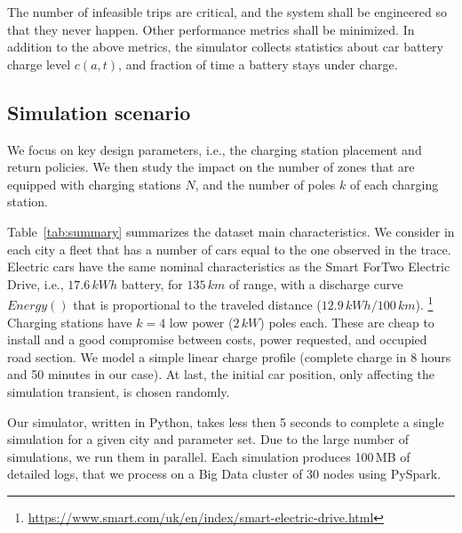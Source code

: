 The number of infeasible trips are critical, and the system shall be engineered so that they never happen. Other performance metrics shall be minimized. 
In addition to the above metrics, the simulator collects statistics about car battery charge level $c(a,t)$, and fraction of time a battery stays under charge.

\subsection{Simulation scenario}

We focus on key design parameters, i.e., the charging station placement and return policies.
We then study the impact on the number of zones that are equipped with charging stations $N$, and the number of poles $k$ of each charging station.

Table~\ref{tab:summary} summarizes the dataset main characteristics.
We consider in each city a fleet that has a number of cars equal to the one observed in the trace. Electric cars have the same nominal characteristics as the Smart ForTwo Electric Drive, i.e., $17.6\,kWh$ battery, for $135\,km$ of range, with a discharge curve $Energy()$ that is proportional to the traveled distance ($12.9\,kWh/100\,km$). \footnote{\url{https://www.smart.com/uk/en/index/smart-electric-drive.html}} 
Charging stations have $k=4$ low power ($2\,kW$) poles each. These are cheap to install and a good compromise between costs, power requested, and occupied road section. We model a simple linear charge profile (complete charge in 8 hours and 50 minutes in our case). At last, the initial car position, only affecting the simulation transient, is chosen randomly.

Our simulator, written in Python, takes less then 5 seconds to complete a single simulation for a given city and parameter set. 
Due to the large number of simulations, we run them in parallel.
Each simulation produces 100\,MB of detailed logs, that we process on a Big Data cluster of 30 nodes using PySpark.%
